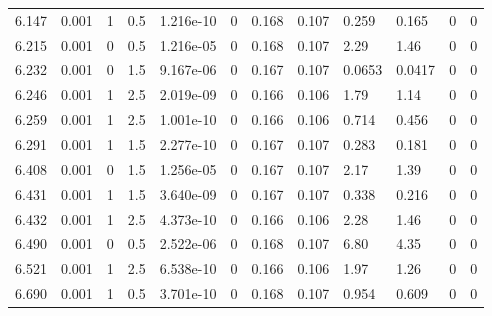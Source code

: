 \documentclass[preview]{standalone}
\begin{document}
{{{{\begin{tabular}{L{1.2cm}C{1.2cm} C{0.3cm}C{0.5cm} C{1.4cm}C{1.4cm} C{1.4cm}C{1.4cm} C{1.6cm}C{1.6cm} C{1.6cm}C{1.6cm}}
  6.147  &  0.001  & 1     & 0.5 &  1.216e-10  & 0  &  0.168&   0.107& 0.259 & 0.165   &  0 & 0  \\ 
  6.215  &  0.001  & 0     & 0.5 &  1.216e-05  & 0  &  0.168&   0.107& 2.29 & 1.46   &  0 & 0  \\ 
  6.232  &  0.001  & 0     & 1.5 &  9.167e-06  & 0  &  0.167&   0.107& 0.0653 & 0.0417   &  0 & 0  \\ 
  6.246  &  0.001  & 1     & 2.5 &  2.019e-09  & 0  &  0.166&   0.106& 1.79 & 1.14   &  0 & 0  \\ 
  6.259  &  0.001  & 1     & 2.5 &  1.001e-10  & 0  &  0.166&   0.106& 0.714 & 0.456   &  0 & 0  \\ 
  6.291  &  0.001  & 1     & 1.5 &  2.277e-10  & 0  &  0.167&   0.107& 0.283 & 0.181   &  0 & 0  \\ 
  6.408  &  0.001  & 0     & 1.5 &  1.256e-05  & 0  &  0.167&   0.107& 2.17 & 1.39   &  0 & 0  \\ 
  6.431  &  0.001  & 1     & 1.5 &  3.640e-09  & 0  &  0.167&   0.107& 0.338 & 0.216   &  0 & 0  \\ 
  6.432  &  0.001  & 1     & 2.5 &  4.373e-10  & 0  &  0.166&   0.106& 2.28 & 1.46   &  0 & 0  \\ 
  6.490  &  0.001  & 0     & 0.5 &  2.522e-06  & 0  &  0.168&   0.107& 6.80 & 4.35   &  0 & 0  \\ 
  6.521  &  0.001  & 1     & 2.5 &  6.538e-10  & 0  &  0.166&   0.106& 1.97 & 1.26   &  0 & 0  \\ 
  6.690  &  0.001  & 1     & 0.5 &  3.701e-10  & 0  &  0.168&   0.107& 0.954 & 0.609   &  0 & 0  \\ 
\hline 
\end{tabular} 

}}}}
\end{document}
